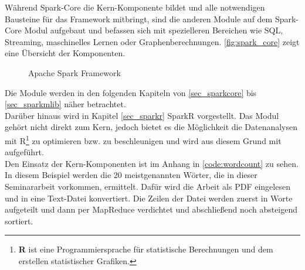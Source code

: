 \newpage
\noindent
Während Spark-Core die Kern-Komponente bildet und alle notwendigen Bausteine für das Framework mitbringt, sind die anderen Module auf dem Spark-Core Modul aufgebaut und befassen sich mit spezielleren Bereichen wie SQL, Streaming, maschinelles Lernen oder Graphenberechnungen. \autoref{fig:spark_core} zeigt eine Übersicht der Komponenten. \\

\begin{figure}[h]
  \centering
  \caption{Apache Spark Framework \cite{DATABRICK_SPARK_KEY_TERMS}}\label{fig:spark_core}
\end{figure}


\noindent
Die Module werden in den folgenden Kapiteln von \ref{sec_sparkcore} bis \ref{sec_sparkmlib} näher betrachtet. \\

\noindent
Darüber hinaus wird in Kapitel \ref{sec_sparkr} SparkR vorgestellt. Das Modul gehört nicht direkt zum Kern, jedoch bietet es die Möglichkeit die Datenanalysen mit R\footnote{\textbf{R} ist eine Programmiersprache für statistische Berechnungen und dem erstellen statistischer Grafiken. } zu optimieren bzw. zu beschleunigen und wird aus diesem Grund mit aufgeführt. \\

\noindent
Den Einsatz der Kern-Komponenten ist im Anhang in \autoref{code:wordcount} zu sehen. In diesem Beispiel werden die 20 meistgenannten Wörter, die in dieser Seminararbeit vorkommen, ermittelt. Dafür wird die Arbeit als PDF eingelesen und in eine Text-Datei konvertiert. Die Zeilen der Datei werden zuerst in Worte aufgeteilt und dann per MapReduce verdichtet und abschließend noch absteigend sortiert.





